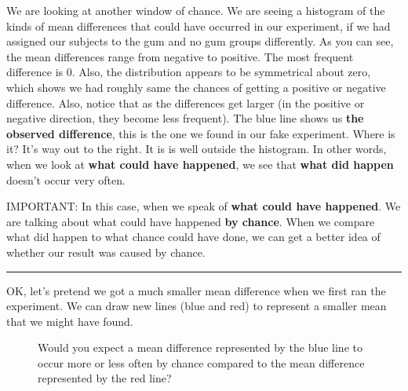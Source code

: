 \documentclass[
  letterpaper,
  DIV=11,
  numbers=noendperiod]{scrreprt}
\begin{document}
We are looking at another window of chance. We are seeing a histogram of
the kinds of mean differences that could have occurred in our
experiment, if we had assigned our subjects to the gum and no gum groups
differently. As you can see, the mean differences range from negative to
positive. The most frequent difference is 0. Also, the distribution
appears to be symmetrical about zero, which shows we had roughly same
the chances of getting a positive or negative difference. Also, notice
that as the differences get larger (in the positive or negative
direction, they become less frequent). The blue line shows us
\textbf{the observed difference}, this is the one we found in our fake
experiment. Where is it? It's way out to the right. It is is well
outside the histogram. In other words, when we look at \textbf{what
could have happened}, we see that \textbf{what did happen} doesn't occur
very often.

IMPORTANT: In this case, when we speak of \textbf{what could have
happened}. We are talking about what could have happened \textbf{by
chance}. When we compare what did happen to what chance could have done,
we can get a better idea of whether our result was caused by chance.

\begin{center}\rule{0.5\linewidth}{0.5pt}\end{center}

OK, let's pretend we got a much smaller mean difference when we first
ran the experiment. We can draw new lines (blue and red) to represent a
smaller mean that we might have found.

\begin{figure}


\caption{\label{fig-5randquestion}Would you expect a mean difference
represented by the blue line to occur more or less often by chance
compared to the mean difference represented by the red line?}

\end{figure}%
\end{document}
